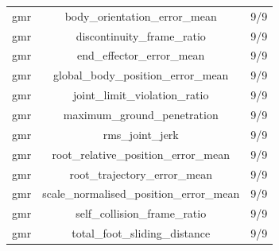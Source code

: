 \begin{table}[t]
{\begin{tabular}{lcc}
gmr & body\_orientation\_error\_mean & 9/9 \\
gmr & discontinuity\_frame\_ratio & 9/9 \\
gmr & end\_effector\_error\_mean & 9/9 \\
gmr & global\_body\_position\_error\_mean & 9/9 \\
gmr & joint\_limit\_violation\_ratio & 9/9 \\
gmr & maximum\_ground\_penetration & 9/9 \\
gmr & rms\_joint\_jerk & 9/9 \\
gmr & root\_relative\_position\_error\_mean & 9/9 \\
gmr & root\_trajectory\_error\_mean & 9/9 \\
gmr & scale\_normalised\_position\_error\_mean & 9/9 \\
gmr & self\_collision\_frame\_ratio & 9/9 \\
gmr & total\_foot\_sliding\_distance & 9/9 \\
\hline
\end{tabular}%
}
\end{table}
